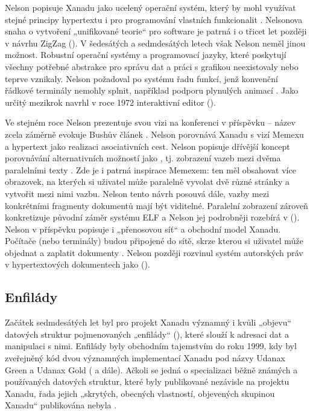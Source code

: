 Nelson popisuje Xanadu jako ucelený operační systém, který by mohl využívat stejné principy hypertextu i pro programování vlastních funkcionalit \autocite[38]{xtdd2}. Nelsonova snaha o vytvoření „unifikované teorie“ pro software je patrná i o třicet let později v návrhu ZigZag ().
V šedesátých a sedmdesátých letech však Nelson neměl jinou možnost. Robustní operační systémy a programovací jazyky, které poskytují všechny potřebné abstrakce pro správu dat a práci s grafikou neexistovaly nebo teprve vznikaly. 
Nelson požadoval po systému řadu funkcí, jenž konvenční řádkové terminály nemohly splnit, například podporu plynulých animací \autocite[34]{xtdd2}. Jako určitý mezikrok navrhl v roce 1972 interaktivní editor  ().

Ve stejném roce Nelson prezentuje svou vizi na konferenci  v příspěvku  -- název zcela záměrně evokuje Bushův článek . Nelson porovnává Xanadu s vizí Memexu a hypertext jako realizaci asociativních cest.
Nelson popisuje dřívější koncept porovnávání alternativních možností jako , tj. zobrazení vazeb mezi dvěma paralelními texty \autocite[The Console]{Nelson1972a}. Zde je i patrná inspirace Memexem: ten měl obsahovat více obrazovek, na kterých si uživatel může paralelně vyvolat dvě různé stránky a vytvořit mezi nimi vazbu. Nelson tento návrh posouvá dále, vazby mezi konkrétními fragmenty dokumentů mají být viditelné.
Paralelní zobrazení zároveň konkretizuje původní záměr systému ELF a Nelson jej podrobněji rozebírá v  (). 
Nelson v příspěvku popisuje i „přenosovou síť“ a obchodní model Xanadu. Počítače (nebo terminály) budou připojené do sítě, skrze kterou si uživatel může objednat a zaplatit dokumenty \autocite[The Transmission Network]{Nelson1972a}. Nelson později rozvinul systém autorských práv v hypertextových dokumentech jako  ().

\subsection{Enfilády}

Začátek sedmdesátých let byl pro projekt Xanadu významný i kvůli „objevu“ datových struktur pojmenovaných „enfilády“ (), které slouží k adresaci dat a manipulaci s nimi. Enfilády byly obchodním tajemstvím do roku 1999, kdy byl zveřejněný kód dvou významných implementací Xanadu pod názvy Udanax Green a Udanax Gold ( a dále).
Ačkoli se jedná o specializaci běžně známých a používaných datových struktur, které byly publikované nezávisle na projektu Xanadu, řada jejich „skrytých, obecných vlastností, objevených skupinou Xanadu“ publikována nebyla \autocite{xutech}.

